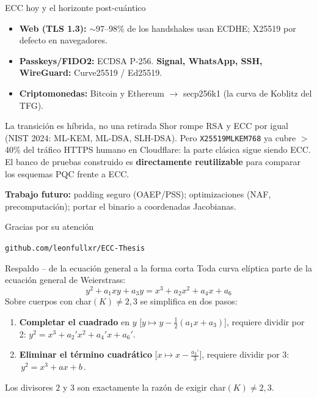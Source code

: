 \documentclass[aspectratio=169,11pt]{beamer}
\begin{document}
\begin{frame}{ECC hoy y el horizonte post-cuántico}
  \footnotesize
  \begin{itemize}\footnotesize
    \item \textbf{Web (TLS 1.3):} $\sim$97--98\% de los handshakes usan ECDHE; \alert{X25519}
      por defecto en navegadores.
    \item \textbf{Passkeys/FIDO2:} ECDSA P-256. \quad \textbf{Signal, WhatsApp, SSH, WireGuard:}
      Curve25519 / Ed25519.
    \item \textbf{Criptomonedas:} Bitcoin y Ethereum $\to$ \alert{secp256k1} (la curva de
      Koblitz del TFG).
  \end{itemize}
  \vspace{0.3ex}
  \begin{alertblock}{La transición es híbrida, no una retirada}
    \scriptsize Shor rompe \alert{RSA y ECC por igual} (NIST 2024: ML-KEM, ML-DSA, SLH-DSA).
    Pero \texttt{X25519MLKEM768} ya cubre $>$40\% del tráfico HTTPS humano en Cloudflare: la
    parte clásica \alert{sigue siendo ECC}. El banco de pruebas construido es
    \textbf{directamente reutilizable} para comparar los esquemas PQC frente a ECC.
  \end{alertblock}
  \footnotesize \textbf{Trabajo futuro:} padding seguro (OAEP/PSS); optimizaciones (NAF,
  precomputación); portar el binario a coordenadas Jacobianas.
\end{frame}

\begin{frame}[standout]
  Gracias por su atención
  \vspace{1em}

  {\normalsize \texttt{github.com/leonfullxr/ECC-Thesis}}
\end{frame}

\appendix

\begin{frame}{Respaldo -- de la ecuación general a la forma corta}
  \small
  Toda curva elíptica parte de la \alert{ecuación general de Weierstrass}:
  \[ y^2 + a_1 xy + a_3 y = x^3 + a_2 x^2 + a_4 x + a_6 \]
  Sobre cuerpos con char$(K)\neq 2,3$ se simplifica en dos pasos:
  \begin{enumerate}\small
    \item \textbf{Completar el cuadrado} en $y$ $\bigl[y \mapsto y - \tfrac{1}{2}(a_1 x + a_3)\bigr]$,
      \alert{requiere dividir por 2}:\; $y^2 = x^3 + a_2' x^2 + a_4' x + a_6'$.
    \item \textbf{Eliminar el término cuadrático} $\bigl[x \mapsto x - \tfrac{a_2'}{3}\bigr]$,
      \alert{requiere dividir por 3}:\; $\boxed{\,y^2 = x^3 + ax + b\,}$.
  \end{enumerate}
  \footnotesize Los divisores $2$ y $3$ son exactamente la razón de exigir char$(K)\neq 2,3$.
\end{frame}
\end{document}
